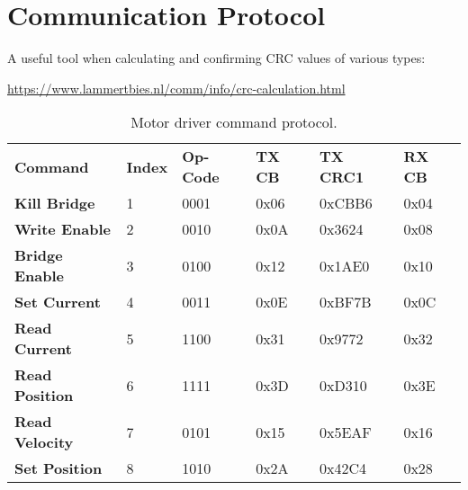 \chapter{Communication Protocol}

A useful tool when calculating and confirming CRC values of various types: 

\url{https://www.lammertbies.nl/comm/info/crc-calculation.html}

\begin{table}[ht!]
\centering
\begin{tabular}{llllll}
\textbf{Command}       & \textbf{Index} & \textbf{Op-Code} & \textbf{TX CB} & \textbf{TX CRC1} & \textbf{RX  CB} \\
\textbf{Kill Bridge}   & 1              & 0001             & 0x06           & 0xCBB6           & 0x04            \\
\textbf{Write Enable}  & 2              & 0010             & 0x0A           & 0x3624           & 0x08            \\
\textbf{Bridge Enable} & 3              & 0100             & 0x12           & 0x1AE0           & 0x10            \\
\textbf{Set Current}   & 4              & 0011             & 0x0E           & 0xBF7B           & 0x0C            \\
\textbf{Read Current}  & 5              & 1100             & 0x31           & 0x9772           & 0x32            \\
\textbf{Read Position} & 6              & 1111             & 0x3D           & 0xD310           & 0x3E            \\
\textbf{Read Velocity} & 7              & 0101             & 0x15           & 0x5EAF           & 0x16            \\
\textbf{Set Position}  & 8              & 1010             & 0x2A           & 0x42C4           & 0x28           
\end{tabular}
\caption{Motor driver command protocol.}
\label{tab:motor-driver-protocol}
\end{table}